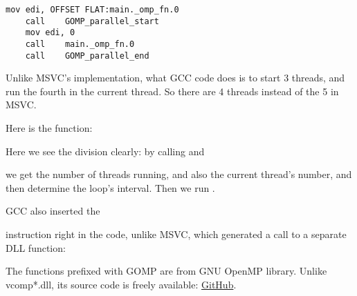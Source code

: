\begin{lstlisting}[caption=GCC 4.8.1,style=customasmx86]
	mov	edi, OFFSET FLAT:main._omp_fn.0
	call	GOMP_parallel_start
	mov	edi, 0
	call	main._omp_fn.0
	call	GOMP_parallel_end
\end{lstlisting}

Unlike MSVC's implementation, what GCC code does is to start 3 threads,
and run the fourth in the current thread. So there are 4 threads instead of the 5 in MSVC.

Here is the  function:
 


Here we see the division clearly: by calling 
 and 

we get the number of threads running, and also the current thread's number, and then determine the loop's interval.
Then we run .

GCC also inserted the  

instruction right in the code, unlike MSVC, which generated a call to a separate DLL function:



The functions prefixed with GOMP are from GNU OpenMP library.
Unlike vcomp*.dll, its source code is freely available: 
\href{https://github.com/mirrors/gcc/tree/master/libgomp}{GitHub}.

